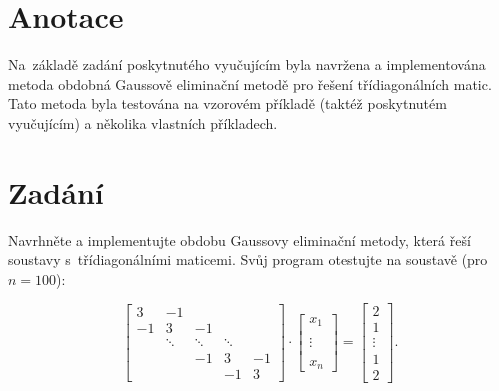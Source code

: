 \documentclass[12pt]{CLASS/protokol}
\begin{document}
\pagestyle{empty}           %
\clearpage                  %
\setcounter{page}{2}        %
\newpage                    %

\section*{Anotace}          %
Na~základě zadání poskytnutého vyučujícím byla navržena a implementována metoda obdobná Gaussově eliminační metodě pro řešení třídiagonálních matic. Tato metoda byla testována na vzorovém příkladě (taktéž poskytnutém vyučujícím) a několika vlastních příkladech.

\newpage                    %
\tableofcontents            %
\newpage
\clearpage\pagestyle{plain} %

\newcommand{\matice}[1]{\textbf{\textit{#1}}}


\section{Zadání}\label{sec:zadani}
    Navrhněte a implementujte obdobu Gaussovy eliminační metody, která řeší soustavy s~třídiagonálními maticemi. Svůj program otestujte na soustavě (pro $n=100$):

    \begin{equation}\label{eq:zadani}
        \begin{bmatrix}   3 & -1 &  &  &  \\  -1 & 3 & -1 &  &  \\   & \ddots & \ddots & \ddots &  \\   &  & -1 & 3 & -1 \\   &  &  & -1 & 3\end{bmatrix} \cdot\begin{bmatrix}   x_1 \\ \\ \vdots \\ \\ x_n\end{bmatrix} =\begin{bmatrix}   2 \\ 1 \\ \vdots \\ 1 \\ 2\end{bmatrix}.
    \end{equation}
\end{document}
